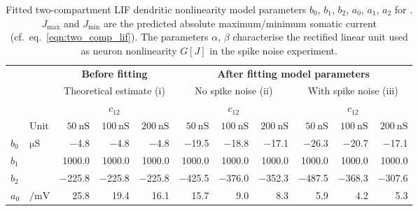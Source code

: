 
\begin{table}[p]
	\caption[Fitted two-compartment LIF dendritic nonlinearity model parameters]{Fitted two-compartment LIF dendritic nonlinearity model parameters $b_0$, $b_1$, $b_2$, $a_0$, $a_1$, $a_2$ for .
	$J_\mathrm{max}$ and $J_\mathrm{min}$ are the predicted absolute maximum/minimum somatic current (cf.~eq.~\ref{eqn:two_comp_lif}).
	The parameters $\alpha$, $\beta$ characterise the rectified linear unit used as neuron nonlinearity $G[J]$ in the spike noise experiment.}
	\renewcommand{\arraystretch}{1.2}
	\small
	\centering
	\sffamily
	\begin{tabular}{l l   r r r   r r r   r r r}
		\toprule
			& & \multicolumn{3}{c}{\textbf{Before fitting}} & \multicolumn{6}{c}{\textbf{After fitting model parameters}} \\
		\cmidrule(l){3-5}
		\cmidrule(l){6-11}
		& & \multicolumn{3}{c}{Theoretical estimate (i)} &
		    \multicolumn{3}{c}{No spike noise (ii)} &
		    \multicolumn{3}{c}{With spike noise (iii)} \\
		\cmidrule(l){3-5}
		\cmidrule(l){6-8}
		\cmidrule(l){9-11}
		& & \multicolumn{3}{c}{$c_{12}$} &
		\multicolumn{3}{c}{$c_{12}$} &
		\multicolumn{3}{c}{$c_{12}$} \\
		& Unit &
		$\SI{50}{\nano\siemens}$ &
		$\SI{100}{\nano\siemens}$ &		
		$\SI{200}{\nano\siemens}$ &		
		$\SI{50}{\nano\siemens}$ &
		$\SI{100}{\nano\siemens}$ &
		$\SI{200}{\nano\siemens}$ &
		$\SI{50}{\nano\siemens}$ &
		$\SI{100}{\nano\siemens}$ &		
		$\SI{200}{\nano\siemens}$ \\
		\cmidrule(r){1-2}
		\cmidrule(l){3-5}
		\cmidrule(l){6-8}
		\cmidrule(l){9-11}

		$b_0$ & $\si{\micro\siemens}$ &
		\num{-4.8} & \num{-4.8} & \num{-4.8} &
		\num{-19.5} & \num{-18.8} & \num{-17.1} &
		\num{-26.3} & \num{-20.7} & \num{-17.1}
		\\

		$b_1$ & &
		\num{1000.0} & \num{1000.0} & \num{1000.0} &
		\num{1000.0} & \num{1000.0} & \num{1000.0} &
		\num{1000.0} & \num{1000.0} & \num{1000.0} \\

		$b_2$ & &
		\num{-225.8} & \num{-225.8} & \num{-225.8} &
		\num{-425.5} & \num{-376.0} & \num{-352.3} &
		\num{-487.5} & \num{-368.3} & \num{-307.6} \\

		$a_0$ & $\si{\per\milli\volt}$ &
		\num{25.8} & \num{19.4} & \num{16.1} &
		\num{15.7} & \num{9.0} & \num{8.3} &
		\num{5.9} & \num{4.2} & \num{5.3} \\


\end{tabular}
\end{table}
